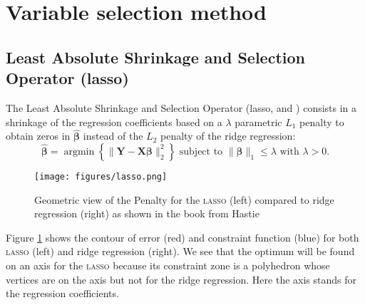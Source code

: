 \documentclass[12pt,a4paper]{report}
\begin{document}
		 \FloatBarrier
	\section{Variable selection method}
		\subsection{Least Absolute Shrinkage and Selection Operator ({\sc lasso})}		%

The Least Absolute Shrinkage and Selection Operator ({\sc lasso}, \cite{tibshirani1996regression} and \cite{tibshiranilasso}) consists in a shrinkage of the regression coefficients based on a $\lambda$ parametric $L_1$ penalty to obtain zeros in $\hat{\boldsymbol{\beta}}$ instead of the $L_2$ penalty of the ridge regression:
		\begin{equation}
		 \boldsymbol{\hat{\beta}}=\operatorname{argmin} \left\lbrace \parallel \boldsymbol{Y}-\boldsymbol{X\beta}\parallel_2^2 \right\rbrace \textrm{ subject to } \parallel\boldsymbol{\beta} \parallel_1\leq \lambda \textrm{ with } \lambda>0 . \nonumber 
		\end{equation}	
		
		\begin{figure}[h!]
			\centering
			\texttt{[image: figures/lasso.png]} 
			\caption{Geometric view of the Penalty for the \textsc{lasso} (left) compared to ridge regression (right) as shown in the book from Hastie \cite{hastie2009elements}} \label{lassogeom}
		\end{figure}
		Figure \ref{lassogeom} shows the contour of error (red) and constraint function (blue) for both \textsc{lasso} (left) and ridge regression (right). We see that the optimum will be found on an axis for the \textsc{lasso} because its constraint zone is a polyhedron whose vertices are on the axis but not for the ridge regression. Here the axis stands for the regression coefficients.\\
		
\end{document}
